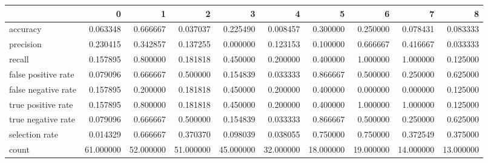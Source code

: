 \begin{tabular}{lrrrrrrrrr}
\toprule
{} &          0 &          1 &          2 &          3 &          4 &          5 &          6 &          7 &          8 \\
\midrule
accuracy            &   0.063348 &   0.666667 &   0.037037 &   0.225490 &   0.008457 &   0.300000 &   0.250000 &   0.078431 &   0.083333 \\
precision           &   0.230415 &   0.342857 &   0.137255 &   0.000000 &   0.123153 &   0.100000 &   0.666667 &   0.416667 &   0.033333 \\
recall              &   0.157895 &   0.800000 &   0.181818 &   0.450000 &   0.200000 &   0.400000 &   1.000000 &   1.000000 &   0.125000 \\
false positive rate &   0.079096 &   0.666667 &   0.500000 &   0.154839 &   0.033333 &   0.866667 &   0.500000 &   0.250000 &   0.625000 \\
false negative rate &   0.157895 &   0.200000 &   0.181818 &   0.450000 &   0.200000 &   0.400000 &   0.000000 &   0.000000 &   0.125000 \\
true positive rate  &   0.157895 &   0.800000 &   0.181818 &   0.450000 &   0.200000 &   0.400000 &   1.000000 &   1.000000 &   0.125000 \\
true negative rate  &   0.079096 &   0.666667 &   0.500000 &   0.154839 &   0.033333 &   0.866667 &   0.500000 &   0.250000 &   0.625000 \\
selection rate      &   0.014329 &   0.666667 &   0.370370 &   0.098039 &   0.038055 &   0.750000 &   0.750000 &   0.372549 &   0.375000 \\
count               &  61.000000 &  52.000000 &  51.000000 &  45.000000 &  32.000000 &  18.000000 &  19.000000 &  14.000000 &  13.000000 \\
\bottomrule
\end{tabular}
